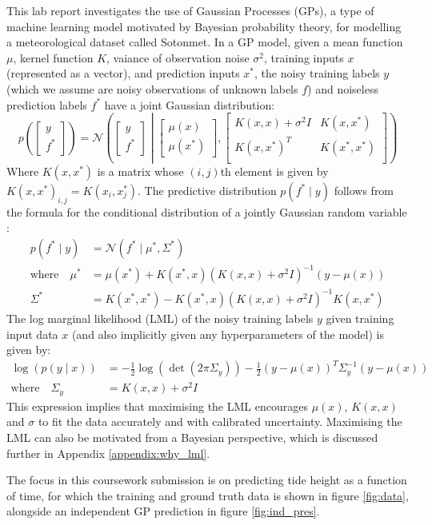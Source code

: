This lab report investigates the use of Gaussian Processes (GPs), a type of machine learning model motivated by Bayesian probability theory, for modelling a meteorological dataset called Sotonmet. In a GP model, given a mean function $\mu$, kernel function $K$, vaiance of observation noise $\sigma^2$, training inputs $x$ (represented as a vector), and prediction inputs $x^*$, the noisy training labels $y$ (which we assume are noisy observations of unknown labels $f$) and noiseless prediction labels $f^*$ have a joint Gaussian distribution:
\begin{equation}
    p\left( \begin{bmatrix}
        y \\
        f^*
    \end{bmatrix} \right)
    = \mathcal{N} \left( \begin{bmatrix}
        y \\
        f^*
    \end{bmatrix} \middle| \begin{bmatrix}
        \mu(x) \\
        \mu(x^*)
    \end{bmatrix}, \begin{bmatrix}
        K(x, x) + \sigma^2 I & K(x, x^*) \\
        K(x, x^*)^T & K(x^*, x^*) \\
    \end{bmatrix} \right)
\end{equation}
Where $K(x, x^*)$ is a matrix whose $(i, j)$th element is given by $K(x, x^*)_{i,j} = K(x_i, x^*_j)$. The predictive distribution $p(f^* \mid y)$ follows from the formula for the conditional distribution of a jointly Gaussian random variable \cite{bishop2006pattern}:
\begin{align}
    p(f^* \mid y) &= \mathcal{N}\left(f^* \mid \mu^*, \Sigma^* \right) \label{eq:conditional distribution} \\
    \text{where} \quad \mu^* &= \mu(x^*) + K(x^*, x) \left( K(x, x) + \sigma^2 I \right)^{-1} (y - \mu(x)) \label{eq:conditional mean} \\
    \Sigma^* &= K(x^*, x^*) - K(x^*, x) \left( K(x, x) + \sigma^2 I \right) ^{-1} K(x, x^*) \label{eq:conditional variance}
\end{align}
The log marginal likelihood (LML) of the noisy training labels $y$ given training input data $x$ (and also implicitly given any hyperparameters of the model) is given by:
\begin{align}
    \log \left( p(y \mid x) \right) &= -\frac{1}{2}\log\left(\det \left(2\pi \Sigma_y \right)\right) -\frac{1}{2}(y - \mu(x))^T \Sigma_y^{-1} (y - \mu(x)) \\
    \text{where} \quad \Sigma_y &= K(x, x) + \sigma^2 I
\end{align}
This expression implies that maximising the LML encourages $\mu(x)$, $K(x,x)$ and $\sigma$ to fit the data accurately and with calibrated uncertainty. Maximising the LML can also be motivated from a Bayesian perspective, which is discussed further in Appendix \ref{appendix:why_lml}.

The focus in this coursework submission is on predicting tide height as a function of time, for which the training and ground truth data is shown in figure \ref{fig:data}, alongside an independent GP prediction in figure \ref{fig:ind_pres}.
